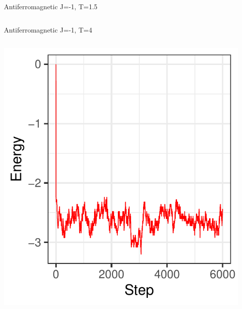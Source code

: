 \documentclass{beamer}
\begin{document}
\begin{frame}{Antiferromagnetic J=-1, T=1.5}
\begin{columns}
\begin{column}{0.5\textwidth}
\begin{center}
     \end{center}
\end{column}
\end{columns}
\end{frame}

\begin{frame}{Antiferromagnetic J=-1, T=4}
\begin{columns}
\begin{column}{0.5\textwidth}
    \begin{center}
     \includegraphics[width=\textwidth]{Pic/J-1_60_2500_T=4_ENERGY.pdf}
     \end{center}
\end{column}
\begin{column}{0.5\textwidth}
    \begin{center}

\end{center}
\end{column}
\end{columns}
\end{frame}
\end{document}

